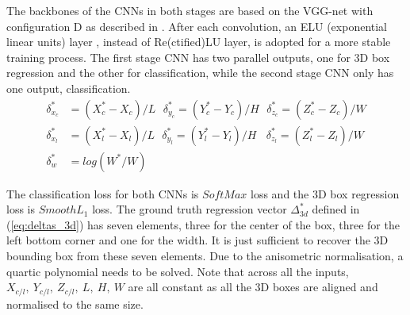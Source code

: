 \documentclass[letterpaper, 10 pt, conference]{ieeeconf}  \usepackage[
\begin{document}
The backbones of the CNNs in both stages are based on the VGG-net with configuration D as described in \cite{simonyan2014very}. After each convolution, an ELU (exponential linear units) layer \cite{clevert2015fast}, instead of Re(ctified)LU layer, is adopted for a more stable training process. The first stage CNN has two parallel outputs, one for 3D box regression and the other for classification, while the second stage CNN only has one output, classification.
\begin{align}
\nonumber
\delta_{x_c}^* &= (X_c^*-X_c)/L~~~\delta_{y_c}^* = (Y_c^*-Y_c)/H~~~\delta_{z_c}^* = (Z_c^*-Z_c)/W \\ \nonumber
\delta_{x_l}^* &= (X_l^*-X_l)/L~~~\delta_{y_l}^* = (Y_l^*-Y_l)/H~~~~\delta_{z_l}^* = (Z_l^*-Z_l)/W \\ 
\delta_{w}^* &= log(W^*/W) 
\label{eq:deltas_3d}
\end{align}

The classification loss for both CNNs is $SoftMax$ loss and the 3D box regression loss is $SmoothL_1$ loss. The ground truth regression vector $\Delta_{3d}^*$ defined in (\ref{eq:deltas_3d}) has seven elements,  three for the center of the box, three for the left bottom corner and one for the width. It is just sufficient to recover the 3D bounding box from these seven elements. Due to the anisometric normalisation, a quartic polynomial needs to be solved. Note that across all the inputs, $X_{c/l}, ~Y_{c/l},~Z_{c/l},~L,~H,~W$ are all constant as all the 3D boxes are aligned and normalised to the same size.
\end{document}
